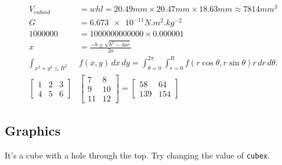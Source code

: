 \begin{align*}
	V_{cuboid} &= w h l = 20.49\si{mm} \times 20.47\si{mm} \times 18.63\si{mm} \approx 7814\si{mm^{3}} \\ 
	G &= \num{6.673e-11}\si{N.m^{2}.kg^{-2}} \\ 
	\num{1000000} &= \num{1000000000000} \times \num{0.000001} \\
	x &= \frac{-b \pm \sqrt{b^2 - 4ac}}{2a} \\
	\int_{x^2 + y^2 \leq R^2} & f(x,y)\,dx\,dy
	    = \int_{\theta=0}^{2\pi} \int_{r=0}^R f(r\cos\theta,r\sin\theta) r\,dr\,d\theta. \\
    \begin{bmatrix} 1 & 2 & 3 \\ 4 & 5 & 6 \end{bmatrix}&
        \begin{bmatrix} 7 & 8 \\ 9 & 10 \\ 11 & 12 \end{bmatrix} =
        \begin{bmatrix} 58 & 64 \\ 139 & 154 \end{bmatrix}
\end{align*}

\subsection{Graphics}

It's a cube with a hole through the top. Try changing the value of \texttt{cubex}.

\begin{figure}[H]
    \label{fig:cube}
\end{figure}


